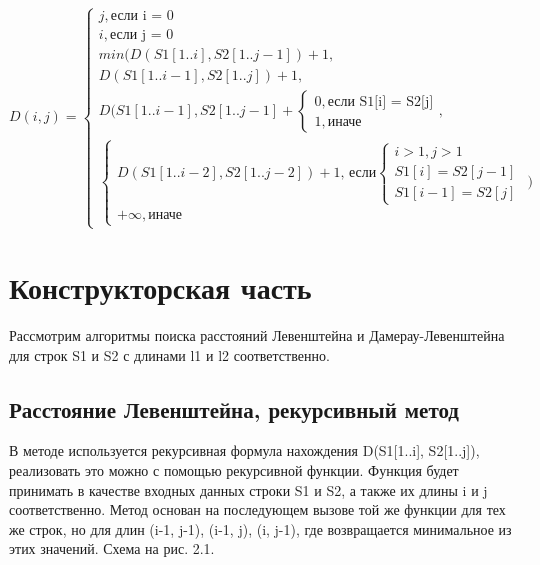 \documentclass[12pt,a4paper]{report}
\begin{document}
\begin{displaymath}
    D(i, j) = \left\{
        \begin{array}{ll}
            j, \textrm{если i = 0} \\
            i, \textrm{если j = 0} \\
            min(D(S1[1..i], S2[1..j-1]) + 1,\\
                D(S1[1..i-1], S2[1..j]) + 1,\\
                D(S1[1..i-1], S2[1..j-1] + \left \{ 
                \begin{array}{ll}
                    0, \textrm{если S1[i] = S2[j]} \\ 
                    1, \textrm{иначе}
                \end{array} \right.
            , \\
                \left \{ \begin{array}{ll}
                    D(S1[1..i-2], S2[1..j-2]) + 1 \textrm{, если} \left \{ 
                    \begin{array}{ll}
                        i > 1, j > 1 \\
                        S1[i] = S2[j-1] \\
                        S1[i-1] = S2[j]
                    \end{array} \right. \\
                    +\infty, \textrm{иначе}
                \end{array} \right. 
            )
    \end{array} \right.
\end{displaymath}

\newpage
\chapter{Конструкторская часть}

Рассмотрим алгоритмы поиска расстояний Левенштейна и Дамерау-Левенштейна для строк S1 и S2 с длинами 
l1 и l2 соответственно.

\section{Расстояние Левенштейна, рекурсивный метод}

В методе используется рекурсивная формула нахождения D(S1[1..i], S2[1..j]), реализовать это можно 
с помощью рекурсивной функции. Функция будет принимать в качестве входных данных строки S1 и S2, а 
также их длины i и j соответственно. Метод основан на последующем вызове той же функции для тех же 
строк, но для длин (i-1, j-1), (i-1, j), (i, j-1), где возвращается минимальное из этих значений. 
Схема на рис. 2.1.
\end{document}
